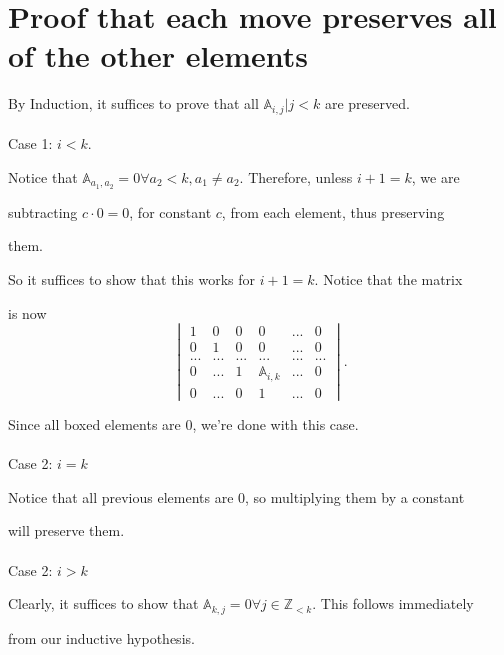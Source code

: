 \documentclass{article}
\begin{document}
\section*{Proof that each move preserves all of the other elements}
By Induction, it suffices to prove that all $\mathbb{A}_{i,j}|j<k$ are preserved. 
\\ \\ Case 1: $i<k$.
\par Notice that $\mathbb{A}_{a_1, a_2}=0\forall a_2<k, a_1\ne a_2$. Therefore, unless $i+1=k$, we are \par subtracting $c\cdot 0=0$, for constant $c$, from each element, thus preserving \par them. \par So it suffices to show that this works for $i+1=k$. Notice that the matrix \par is now
$$\begin{vmatrix}1 & 0 & 0 & 0 & ... & 0\\ 0 & 1 & 0 & 0 & ...  & 0\\ ... & ... & ... & ... & ... & ...\\ 0 & ... & 1 &\mathbb{A}_{i,k}&...&0\\ \boxed{0} & ... & \boxed{0} & 1 & ... & 0\end{vmatrix}.$$
\par Since all boxed elements are $0$, we're done with this case. 
\\ \\ Case 2: $i=k$
\par Notice that all previous elements are $0$, so multiplying them by a constant \par will preserve them.
\\ \\ Case 2: $i>k$
\par Clearly, it suffices to show that $\mathbb{A}_{k,j}=0\forall j\in\mathbb{Z}_{<k}$. This follows immediately \par from our inductive hypothesis.
\end{document}

